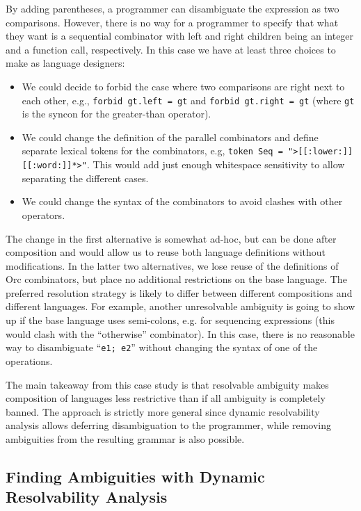 \documentclass[runningheads]{llncs}
\newcommand{\ocaml}{\lstinline[language={[objective]caml}]}
\newcommand{\syncon}{\lstinline[language=syncon]}
\begin{document}
\noindent
By adding parentheses, a programmer can disambiguate the
expression as two comparisons. However, there is no way for a
programmer to specify that what they want is a sequential
combinator with left and right children being an integer and a
function call, respectively. In this case we have at least three
choices to make as language designers:

\begin{itemize}
\item We could decide to forbid the case where two comparisons are
  right next to each other, e.g., \syncon{forbid gt.left = gt} and
  \syncon{forbid gt.right = gt} (where \syncon{gt} is the syncon
  for the greater-than operator).
\item We could change the definition of the parallel combinators
  and define separate lexical tokens for the combinators, e.g,
  \syncon{token Seq = ">[[:lower:]]}\\\syncon{[[:word:]]*>"}. This
  would add just enough whitespace sensitivity to allow separating
  the different cases.
\item We could change the syntax of the combinators to avoid
  clashes with other operators.
\end{itemize}

\noindent
The change in the first alternative is somewhat ad-hoc, but can be done after composition
and would allow us to reuse both language definitions without
modifications. In the latter two alternatives, we lose reuse of
the definitions of Orc combinators, but place no additional
restrictions on the base language. The preferred resolution
strategy is likely to differ between different compositions and
different languages.
%
For example, another unresolvable ambiguity is going to show up if
the base language uses semi-colons, e.g. for sequencing
expressions (this would clash with the ``otherwise'' combinator).
In this case, there is no reasonable way to disambiguate
``\ocaml{e1; e2}'' without changing the syntax of one of the
operations.

The main takeaway from this case study is that resolvable
ambiguity makes composition of languages less restrictive than if
all ambiguity is completely banned. The approach is strictly more
general since dynamic resolvability analysis allows deferring
disambiguation to the programmer, while removing ambiguities from
the resulting grammar is also possible.


\subsection{Finding Ambiguities with Dynamic Resolvability Analysis} \label{sec:evaluation-ocaml}
\end{document}
